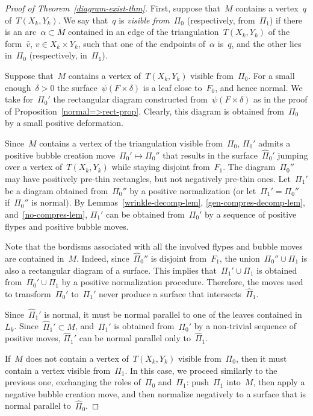 \documentclass{amsart}
\theoremstyle{theorem}
\theoremstyle{remark}
\theoremstyle{definition}
\numberwithin{equation}{section}
\numberwithin{figure}{section}
\begin{document}
\begin{proof}[Proof of Theorem~\ref{diagram-exist-thm}]
First, suppose that~$M$ contains a vertex~$q$ of~$T(X_k,Y_k)$.
We say that~$q$ is \emph{visible from~$\Pi_0$} (respectively, from~$\Pi_1$) if there is
an arc~$\alpha\subset\overline M$ contained in an edge of the triangulation~$T(X_k,Y_k)$ of the form~$\widehat v$, $v\in X_k\times Y_k$,
such that one of the endpoints of~$\alpha$ is~$q$, and the other lies in~$\Pi_0$ (respectively, in~$\Pi_1$).

Suppose that~$M$ contains a vertex of~$T(X_k,Y_k)$ visible from~$\Pi_0$.
For a small enough~$\delta>0$ the surface~$\psi(F\times\delta)$ is a leaf close to~$F_0$, and hence normal.
We take for~$\Pi_0'$ the rectangular diagram constructed from~$\psi(F\times\delta)$
as in the proof of Proposition~\ref{normal=>rect-prop}. Clearly, this diagram is obtained from~$\Pi_0$
by a small positive deformation.

Since~$M$ contains a vertex of the triangulation visible from~$\Pi_0$,
$\Pi_0'$ admits a positive bubble creation move~$\Pi_0'\mapsto\Pi_0''$
that results in the surface~$\widehat\Pi_0'$ jumping over a vertex of~$T(X_k,Y_k)$ while staying disjoint from~$F_1$.
The diagram~$\Pi_0''$ may have positively pre-thin rectangles, but not negatively pre-thin ones.
Let~$\Pi_1'$ be
a diagram obtained from~$\Pi_0''$ by a positive normalization (or let~$\Pi_1'=\Pi_0''$
if~$\widehat\Pi_0''$ is normal). By Lemmas~\ref{wrinkle-decomp-lem}, \ref{gen-compres-decomp-lem},
and~\ref{no-compres-lem}, $\Pi_1'$
can be obtained from~$\Pi_0'$ by a sequence of positive flypes and positive bubble moves.

Note that the bordisms associated with all the involved flypes and bubble moves are contained in~$M$.
Indeed, since~$\widehat\Pi_0''$ is disjoint from~$F_1$,
the union~$\Pi_0''\cup\Pi_1$
is also a rectangular diagram of a surface. This implies that~$\Pi_1'\cup\Pi_1$ is obtained from~$\Pi_0'\cup\Pi_1$
by a positive normalization procedure. Therefore, the moves used to transform~$\Pi_0'$ to~$\Pi_1'$ never produce a surface
that intersects~$\widehat\Pi_1$.

Since~$\widehat\Pi_1'$ is normal, it must be normal parallel to one of the leaves contained in~$L_k$.
Since~$\widehat\Pi_1'\subset M$, and~$\Pi_1'$ is obtained from~$\Pi_0'$ by a non-trivial sequence
of positive moves, $\widehat\Pi_1'$ can be normal parallel only to~$\widehat\Pi_1$.


If~$M$ does not contain a vertex of~$T(X_k,Y_k)$ visible from~$\Pi_0$, then it must contain a vertex visible from~$\Pi_1$.
In this case, we proceed similarly to the previous one, exchanging the roles of~$\Pi_0$ and~$\Pi_1$: push~$\Pi_1$ into~$M$, then apply a negative
bubble creation move, and then normalize negatively to a surface that is normal parallel to~$\widehat\Pi_0$.


\end{proof}
\end{document}
